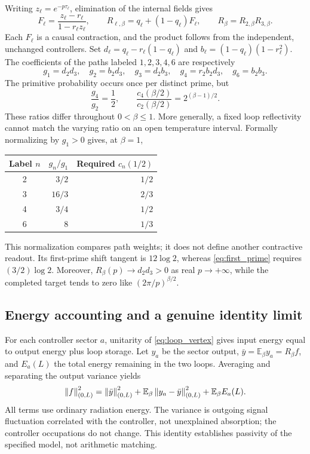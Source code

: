 Writing $z_\ell=e^{-p\tau_\ell}$, elimination of the internal fields gives
\begin{equation}
 F_\ell=\frac{z_\ell-r_\ell}{1-r_\ell z_\ell},\qquad
 R_{\ell,\beta}=q_\ell+(1-q_\ell)F_\ell,\qquad
 R_\beta=R_{2,\beta}R_{3,\beta}.
 \label{eq:thermal_loop_transfer}
\end{equation}
Each $F_\ell$ is a causal contraction, and the product follows from the
independent, unchanged controllers. Set
$d_\ell=q_\ell-r_\ell(1-q_\ell)$ and
$b_\ell=(1-q_\ell)(1-r_\ell^2)$. The coefficients of the paths labeled
$1,2,3,4,6$ are respectively
\begin{equation}
 g_1=d_2d_3,\quad g_2=b_2d_3,\quad g_3=d_2b_3,\quad
 g_4=r_2b_2d_3,\quad g_6=b_2b_3.
\end{equation}
The primitive probability occurs once per distinct prime, but
\begin{equation}
 \frac{g_4}{g_2}=\frac12,\qquad
 \frac{c_4(\beta/2)}{c_2(\beta/2)}=2^{(\beta-1)/2}.
 \label{eq:loop_repetition_failure}
\end{equation}
These ratios differ throughout $0<\beta\le1$. More generally, a fixed
loop reflectivity cannot match the varying ratio on an open temperature
interval. Formally normalizing by $g_1>0$ gives, at $\beta=1$,
\begin{center}
\begin{tabular}{c r r}
\toprule
Label $n$ & $g_n/g_1$ & Required $c_n(1/2)$\\
\midrule
2 & $3/2$ & $1/2$\\
3 & $16/3$ & $2/3$\\
4 & $3/4$ & $1/2$\\
6 & $8$ & $1/3$\\
\bottomrule
\end{tabular}
\end{center}
This normalization compares path weights; it does not define another
contractive readout. Its first-prime shift tangent is $12\log2$,
whereas \eqref{eq:first_prime} requires $(3/2)\log2$. Moreover,
$R_\beta(p)\to d_2d_3>0$ as real $p\to+\infty$, while the completed
target tends to zero like $(2\pi/p)^{\beta/2}$.

\subsection{Energy accounting and a genuine identity limit}

For each controller sector $a$, unitarity of \eqref{eq:loop_vertex}
gives input energy equal to output energy plus loop storage. Let
$y_a$ be the sector output, $\bar y=\mathbb E_\beta y_a=R_\beta f$,
and $E_a(L)$ the total energy remaining in the two loops. Averaging
and separating the output variance yields
\begin{equation}
 \left\lVert f\right\rVert_{(0,L)}^2=\left\lVert\bar y\right\rVert_{(0,L)}^2
 +\mathbb E_\beta\left\lVert y_a-\bar y\right\rVert_{(0,L)}^2
 +\mathbb E_\beta E_a(L).
 \label{eq:loop_energy}
\end{equation}
All terms use ordinary radiation energy. The variance is outgoing
signal fluctuation correlated with the controller, not unexplained
absorption; the controller occupations do not change. This identity
establishes passivity of the specified model, not arithmetic matching.

